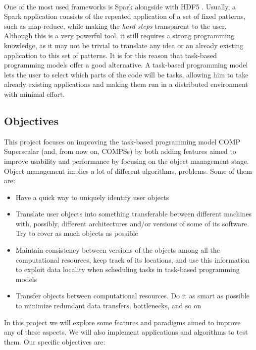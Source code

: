 \\
One of the most used frameworks is Spark \cite{Zaharia:2010:SCC:1863103.1863113} alongside with HDF5 \cite{shvachko2010hadoop}. Usually, a Spark application consists of the repeated application of a set of fixed patterns, such as map-reduce, while making the \textit{hard steps} transparent to the user. Although this is a very powerful tool, it still requires a strong programming knowledge, as it may not be trivial to translate any idea or an already existing application to this set of patterns. It is for this reason that task-based programming models offer a good alternative. A task-based programming model lets the user to select which parts of the code will be tasks, allowing him to take already existing applications and making them run in a distributed environment with minimal effort.


\subsection{Objectives}
\label{subsec:intro_objectives}
This project focuses on improving the task-based programming model COMP Superscalar (and, from now on, COMPSs) \cite{compss} by both adding features aimed to improve usability and performance by focusing on the object management stage. Object management implies a lot of different algorithms, problems. Some of them are:
\begin{itemize}
\item Have a quick way to uniquely identify user objects
\item Translate user objects into something transferable between different machines with, possibly, different architectures and/or versions of some of its software. Try to cover as much objects as possible
\item Maintain consistency between versions of the objects among all the computational resources, keep track of its locations, and use this information to exploit data locality when scheduling tasks in task-based programming models
\item Transfer objects between computational resources. Do it as smart as possible to minimize redundant data transfers, bottlenecks, and so on
\end{itemize}
In this project we will explore some features and paradigms aimed to improve any of these aspects. We will also implement applications and algorithms to test them. Our specific objectives are:

